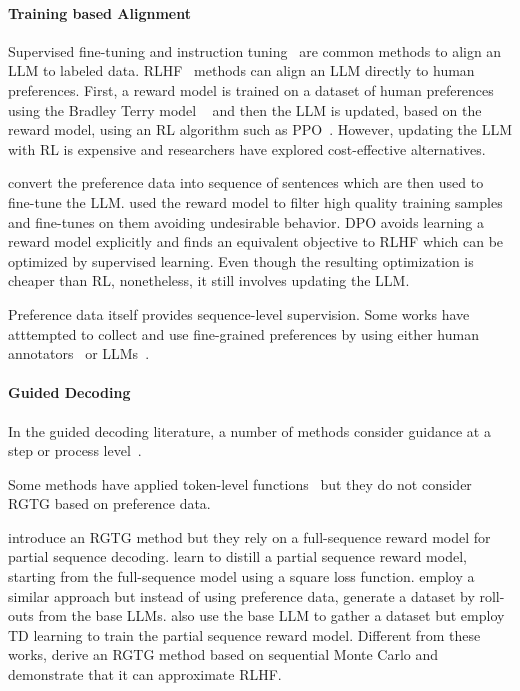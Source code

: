\paragraph{Training based Alignment}

Supervised fine-tuning and instruction tuning~\citep{wei2021finetuned} are common methods to align an LLM to labeled data. RLHF~\citep{christiano2017deep,ziegler2019fine,lee2021pebble,nakano2021webgpt,snell2022offline} methods can align an LLM directly to human preferences. First, a reward model is trained on a dataset of human preferences using the Bradley Terry model ~\citep{bradleyterry1952paired} and then the LLM is updated, based on the reward model, using an RL algorithm such as PPO~\cite{schulman2017proximal}. However, updating the LLM with RL is expensive and researchers have explored cost-effective alternatives.

\cite{liu2023chain} convert the preference data into sequence of sentences which are then used to fine-tune the LLM. \cite{dong2023raft} used the reward model to filter high quality training samples and fine-tunes on them avoiding undesirable behavior. DPO \cite{rafailov2023direct,rafailov2024qfunction} avoids learning a reward model explicitly and finds an equivalent objective to RLHF which can be optimized by supervised learning. Even though the resulting optimization is cheaper than RL, nonetheless, it still involves updating the LLM.

Preference data itself provides sequence-level supervision. Some works have atttempted to collect and use fine-grained preferences by using either human annotators~\citep{wu2024fine} or LLMs~\citep{cao2024sparserewardsenhancingreinforcement}.


\paragraph{Guided Decoding}

In the guided decoding literature, a number of methods consider guidance at a step or process level~\citep{welleck2022naturalprover,uesato2022solving, lightman2023let, krishna2022rankgen,li2023making, khalifa2023grace, yao2023tree}. 

Some methods have applied token-level functions~\citep{dathathri2019plug, krause2021gedi, yang2021fudge,chaffin2022ppl, liu2023attribute} but they do not consider RGTG based on preference data. 

\citet{khanov2023alignment} introduce an RGTG method but they rely on a full-sequence reward model for partial sequence decoding. \citet{deng2023reward} learn to distill a partial sequence reward model, starting from the full-sequence model using a square loss function. \citet{mudgalcontrolled} employ a similar approach but instead of using preference data, generate a dataset by roll-outs from the base LLMs. \citet{han2024value} also use the base LLM to gather a dataset but employ TD learning to train the partial sequence reward model. Different from these works, \citet{zhao2024probabilistic} derive an RGTG method based on sequential Monte Carlo and demonstrate that it can approximate RLHF.



  



